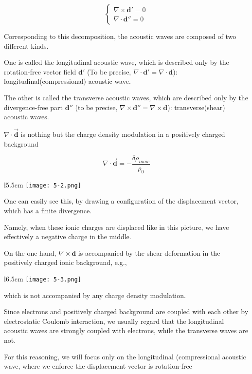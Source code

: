 ﻿\documentclass[twoside]{book}
\numberwithin{equation}{section}
\begin{document}
\[\begin{cases}
\nabla\times\bm{d'} = 0\\
\nabla\cdot\bm{d''} = 0
\end{cases}\]

Corresponding to this decomposition, the acoustic waves are composed of two different kinds. 

One is called the longitudinal acoustic wave, which is described only by the rotation-free vector field $\bm{d'}$ (To be precise, $\nabla\cdot \bm{d'} = \nabla\cdot\bm{d}$): longitudinal(compressional) acoustic wave. 

The other is called the transverse acoustic waves, which are described only by the divergence-free part $\bm{d''}$ (to be precise, $\nabla\times\bm{d''} = \nabla\times\bm{d}$): transverse(shear) acoustic waves. 

$\nabla\cdot \vec{\bm{d}}$ is nothing but the charge density modulation in a positively charged background

\[\nabla\cdot\vec{\bm{d}} = -\frac{\delta\rho_{inoic}}{\rho_0}\]

\begin{wrapfigure}{l}{5.5cm}
\texttt{[image: 5-2.png]}
\end{wrapfigure}
One can easily see this, by drawing a configuration of the displacement vector, which has a finite divergence. 

Namely, when these ionic charges are displaced like in this picture, we have effectively a negative charge in the middle. 

On the one hand, $\nabla\times\bm{d}$ is accompanied by the shear deformation in the positively charged ionic background, e.g.,

\begin{figure}
\end{figure}
\begin{wrapfigure}{l}{6.5cm}
\texttt{[image: 5-3.png]}
\end{wrapfigure}

which is not accompanied by any charge density modulation. 

Since electrons and positively charged background are coupled with each other by electrostatic Coulomb interaction, we usually regard that the longitudinal acoustic waves are strongly coupled with electrons, while the transverse waves are not. 

For this reasoning, we will focus only on the longitudinal (compressional acoustic wave, where we enforce the displacement vector is rotation-free
\end{document}

